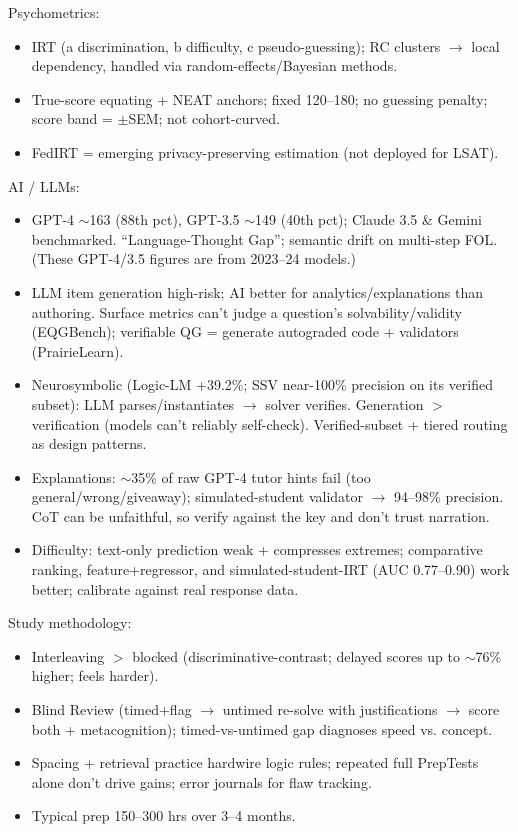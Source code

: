 \documentclass[11pt]{article}
\begin{document}
Psychometrics:
\begin{itemize}
\item IRT (a discrimination, b difficulty, c pseudo-guessing); RC clusters $\rightarrow$ local dependency, handled via random-effects/Bayesian methods.
\item True-score equating + NEAT anchors; fixed 120--180; no guessing penalty; score band = $\pm$SEM; not cohort-curved.
\item FedIRT = emerging privacy-preserving estimation (not deployed for LSAT).
\end{itemize}

AI / LLMs:
\begin{itemize}
\item GPT-4 $\sim$163 (88th pct), GPT-3.5 $\sim$149 (40th pct); Claude 3.5 \& Gemini benchmarked. \enquote{Language-Thought Gap}; semantic drift on multi-step FOL. (These GPT-4/3.5 figures are from 2023--24 models.)
\item LLM item generation high-risk; AI better for analytics/explanations than authoring. Surface metrics can't judge a question's solvability/validity (EQGBench); verifiable QG = generate autograded code + validators (PrairieLearn).
\item Neurosymbolic (Logic-LM +39.2\%; SSV near-100\% precision on its verified subset): LLM parses/instantiates $\rightarrow$ solver verifies. Generation $>$ verification (models can't reliably self-check). Verified-subset + tiered routing as design patterns.
\item Explanations: $\sim$35\% of raw GPT-4 tutor hints fail (too general/wrong/giveaway); simulated-student validator $\rightarrow$ 94--98\% precision. CoT can be unfaithful, so verify against the key and don't trust narration.
\item Difficulty: text-only prediction weak + compresses extremes; comparative ranking, feature+regressor, and simulated-student-IRT (AUC 0.77--0.90) work better; calibrate against real response data.
\end{itemize}

Study methodology:
\begin{itemize}
\item Interleaving $>$ blocked (discriminative-contrast; delayed scores up to $\sim$76\% higher; feels harder).
\item Blind Review (timed+flag $\rightarrow$ untimed re-solve with justifications $\rightarrow$ score both + metacognition); timed-vs-untimed gap diagnoses speed vs. concept.
\item Spacing + retrieval practice hardwire logic rules; repeated full PrepTests alone don't drive gains; error journals for flaw tracking.
\item Typical prep 150--300 hrs over 3--4 months.
\end{itemize}
\end{document}
